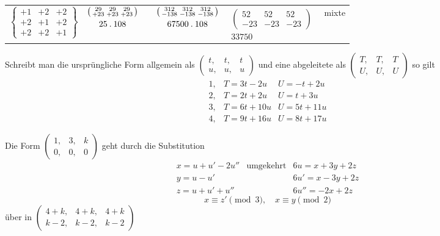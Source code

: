 \begin{center}
\begin{tabular}{ccccc l}
$\left\{\begin{smallmatrix}+1&+2&+2\\+2&+1&+2\\+2&+2&+1\end{smallmatrix}\right\}$&
$\begin{gathered}\left(\begin{smallmatrix}29&29&29\\+23&+23&+23\end{smallmatrix}\right)\\25\mathbin{.}108\end{gathered}$&&
$\begin{gathered}\left(\begin{smallmatrix}312&312&312\\-138&-138&-138\end{smallmatrix}\right)\\67500\mathbin{.}108\end{gathered}$&
$\begin{gathered}\left(\begin{smallmatrix}52&52&52\\-23&-23&-23\end{smallmatrix}\right)\\33750\end{gathered}$&mixte
\end{tabular}\end{center}

Schreibt man die ursprüngliche Form allgemein als $\left(\begin{smallmatrix}t,&t,&t\\u,&u,&u\end{smallmatrix}\right)$ und eine abgeleitete als $\left(\begin{smallmatrix}T,&T,&T\\U,&U,&U\end{smallmatrix}\right)$ so gilt
\[
\begin{array}{rll}
1,&T=3t-2u&U=-t+2u\\
2,&T=2t+2u&U=t+3u\\
3,&T=6t+10u&U=5t+11u\\
4,&T=9t+16u&U=8t+17u
\end{array}
\]

Die Form $\left(\begin{smallmatrix}1,&3,&k\\0,&0,&0\end{smallmatrix}\right)$ geht durch die Substitution
\[
\begin{array}{lll}
x=u+u'-2u''&\text{umgekehrt}&6u=x+3y+2z\\
y=u-u'&&6u'=x-3y+2z\\
z=u+u'+u''&&6u''=-2x+2z
\end{array}
\]
\[
x\equiv z'\pmod3,\quad x\equiv y\pmod2
\]
über in $\left(\begin{smallmatrix}4+k,&4+k,&4+k\\k-2,&k-2,&k-2\end{smallmatrix}\right)$

